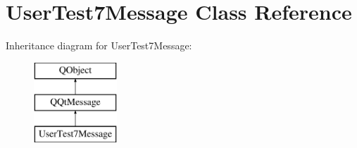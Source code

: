 \hypertarget{class_user_test7_message}{}\section{User\+Test7\+Message Class Reference}
\label{class_user_test7_message}
Inheritance diagram for User\+Test7\+Message\+:\begin{figure}[H]
\begin{center}
\leavevmode
\includegraphics[height=3.000000cm]{class_user_test7_message}
\end{center}
\end{figure}
